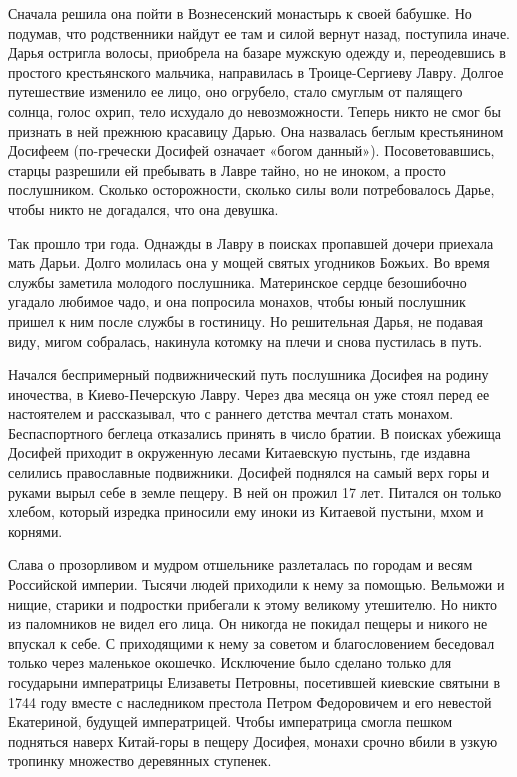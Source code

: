Сначала решила она пойти в Вознесенский монастырь к своей бабушке. Но подумав,
что родственники найдут ее там и силой вернут назад, поступила иначе. Дарья
остригла волосы, приобрела на базаре мужскую одежду и, переодевшись в простого
крестьянского мальчика, направилась в Троице-Сергиеву Лавру. Долгое путешествие
изменило ее лицо, оно огрубело, стало смуглым от палящего солнца, голос охрип,
тело исхудало до невозможности. Теперь никто не смог бы признать в ней прежнюю
красавицу Дарью. Она назвалась беглым крестьянином Досифеем (по-гречески
Досифей означает «богом данный»). Посоветовавшись, старцы разрешили ей
пребывать в Лавре тайно, но не иноком, а просто послушником. Сколько
осторожности, сколько силы воли потребовалось Дарье, чтобы никто не догадался,
что она девушка.

Так прошло три года. Однажды в Лавру в поисках пропавшей дочери приехала мать
Дарьи. Долго молилась она у мощей святых угодников Божьих. Во время службы
заметила молодого послушника. Материнское сердце безошибочно угадало любимое
чадо, и она попросила монахов, чтобы юный послушник пришел к ним после службы в
гостиницу. Но решительная Дарья, не подавая виду, мигом собралась, накинула
котомку на плечи и снова пустилась в путь.

Начался беспримерный подвижнический путь послушника Досифея на родину
иночества, в Киево-Печерскую Лавру. Через два месяца он уже стоял перед ее
настоятелем и рассказывал, что с раннего детства мечтал стать монахом.
Беспаспортного беглеца отказались принять в число братии. В поисках убежища
Досифей приходит в окруженную лесами Китаевскую пустынь, где издавна селились
православные подвижники. Досифей поднялся на самый верх горы и руками вырыл
себе в земле пещеру. В ней он прожил 17 лет. Питался он только хлебом, который
изредка приносили ему иноки из Китаевой пустыни, мхом и корнями.

Слава о прозорливом и мудром отшельнике разлеталась по городам и весям
Российской империи. Тысячи людей приходили к нему за помощью. Вельможи и нищие,
старики и подростки прибегали к этому великому утешителю. Но никто из
паломников не видел его лица. Он никогда не покидал пещеры и никого не впускал
к себе. С приходящими к нему за советом и благословением беседовал только через
маленькое окошечко. Исключение было сделано только для государыни императрицы
Елизаветы Петровны, посетившей киевские святыни в 1744 году вместе с
наследником престола Петром Федоровичем и его невестой Екатериной, будущей
императрицей. Чтобы императрица смогла пешком подняться наверх Китай-горы в
пещеру Досифея, монахи срочно вбили в узкую тропинку множество деревянных
ступенек.

